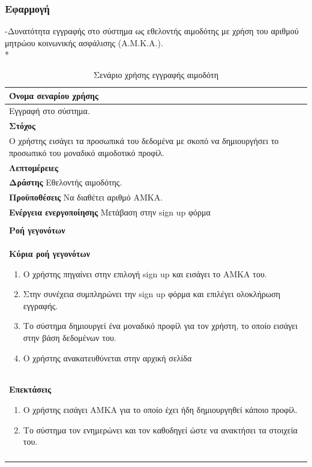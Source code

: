 	\subsubsection{Εφαρμογή}
-Δυνατότητα εγγραφής στο σύστημα ως εθελοντής αιμοδότης με χρήση του αριθμού μητρώου κοινωνικής ασφάλισης (Α.Μ.Κ.Α.).
\\*
\begin{table}[H]
	\begin{center}
	    \begin{tabular}{|p{\dimexpr \linewidth-2\tabcolsep}|}
	    \hline
	    \rowcolor{grayy}
	    \textbf{Όνομα σεναρίου χρήσης}
	    \\ \hline    
	    Εγγραφή στο σύστημα.
	    \\ \hline
	    \rowcolor{grayy}
	    \textbf{Στόχος}
	    \\ \hline
	   Ο χρήστης εισάγει τα προσωπικά του δεδομένα με σκοπό να δημιουργήσει το προσωπικό του  μοναδικό αιμοδοτικό προφίλ.
	    \\ \hline
	    \rowcolor{grayy}
	    \textbf{Λεπτομέρειες}
	    \\ \hline
		\textbf{Δράστης} Εθελοντής αιμοδότης.
		\\*
		\textbf{Προϋποθέσεις} Να διαθέτει αριθμό ΑΜΚΑ.
		\\*
		\textbf{Ενέργεια ενεργοποίησης} Μετάβαση στην sign up φόρμα
		\\ \hline
	    \\ \hline
		\rowcolor{grayy}    
	    \textbf{Ροή γεγονότων}
	    \\* 
		\textbf{Κύρια ροή γεγονότων}
		\begin{enumerate}
			\item	Ο χρήστης πηγαίνει στην επιλογή sign up και εισάγει το ΑΜΚΑ του.
			\item Στην συνέχεια συμπληρώνει την sign up φόρμα και επιλέγει ολοκλήρωση εγγραφής.
			\item Το σύστημα δημιουργεί ένα μοναδικό προφίλ για τον χρήστη, το οποίο εισάγει στην βάση δεδομένων του.
			\item Ο χρήστης ανακατευθύνεται στην αρχική σελίδα 
		\end{enumerate}
		\\*
		\textbf{Επεκτάσεις} 
		\begin{enumerate}
			\item	Ο χρήστης εισάγει ΑΜΚΑ για το οποίο έχει ήδη δημιουργηθεί κάποιο προφίλ.
			\item Το σύστημα τον ενημερώνει και τον καθοδηγεί ώστε να ανακτήσει τα στοιχεία του.
		\end{enumerate}
		\\*
		\\ \hline
	    \end{tabular}
	    \caption{Σενάριο χρήσης εγγραφής αιμοδότη}
		\label{tab:blood_donor_register}
	\end{center}
\end{table}

